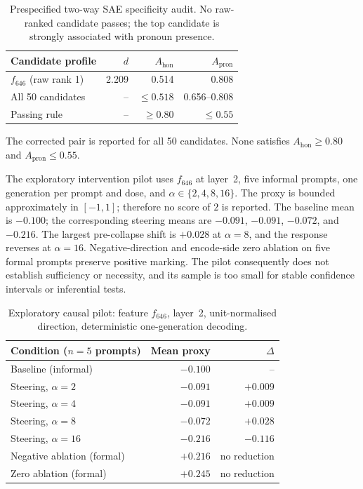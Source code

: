 \documentclass[10pt]{article}
\begin{document}
\begin{table}[H]
\centering
\small
\begin{tabular*}{\textwidth}{@{\extracolsep{\fill}}lrrr@{}}
\toprule
\textbf{Candidate profile} & $d$ & $A_{\mathrm{hon}}$ & $A_{\mathrm{pron}}$ \\
\midrule
$f_{646}$ (raw rank 1) & 2.209 & 0.514 & 0.808 \\
All 50 candidates & -- & $\leq0.518$ & 0.656--0.808 \\
Passing rule & -- & $\geq0.80$ & $\leq0.55$ \\
\bottomrule
\end{tabular*}
\caption{Prespecified two-way SAE specificity audit. No raw-ranked candidate
passes; the top candidate is strongly associated with pronoun presence.}
\label{tab:sae-audit}
\end{table}

The corrected pair is reported for all 50 candidates. None satisfies
$A_{\mathrm{hon}}\geq0.80$ and $A_{\mathrm{pron}}\leq0.55$.

The exploratory intervention pilot uses $f_{646}$ at layer~2, five informal
prompts, one generation per prompt and dose, and
$\alpha\in\{2,4,8,16\}$. The proxy is bounded approximately in $[-1,1]$;
therefore no score of $2$ is reported. The baseline mean is $-0.100$; the
corresponding steering means are $-0.091$, $-0.091$, $-0.072$, and $-0.216$.
The largest pre-collapse shift is $+0.028$ at $\alpha=8$, and the response
reverses at $\alpha=16$. Negative-direction and encode-side zero ablation on
five formal prompts preserve positive marking. The pilot consequently does not
establish sufficiency or necessity, and its sample is too small for stable
confidence intervals or inferential tests.

\begin{table}[H]
\centering
\small
\begin{tabular}{lrr}
\toprule
\textbf{Condition ($n=5$ prompts)} & \textbf{Mean proxy} & \textbf{$\Delta$} \\
\midrule
Baseline (informal) & $-0.100$ & -- \\
Steering, $\alpha=2$ & $-0.091$ & $+0.009$ \\
Steering, $\alpha=4$ & $-0.091$ & $+0.009$ \\
Steering, $\alpha=8$ & $-0.072$ & $+0.028$ \\
Steering, $\alpha=16$ & $-0.216$ & $-0.116$ \\
Negative ablation (formal) & $+0.216$ & no reduction \\
Zero ablation (formal) & $+0.245$ & no reduction \\
\bottomrule
\end{tabular}
\caption{Exploratory causal pilot: feature $f_{646}$, layer~2,
unit-normalised direction, deterministic one-generation decoding.}
\label{tab:causal-pilot}
\end{table}
\end{document}
